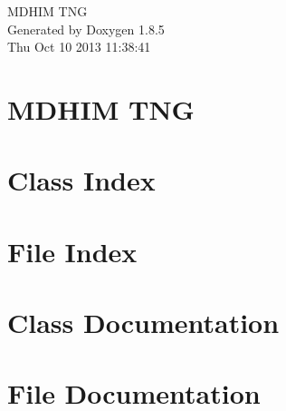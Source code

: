 \documentclass[twoside]{book}
\newcommand{\clearemptydoublepage}{%
  \newpage{\pagestyle{empty}\cleardoublepage}%
}
\begin{document}
\hypersetup{pageanchor=false}
\begin{titlepage}
\vspace*{7cm}
\begin{center}%
{\Large M\-D\-H\-I\-M T\-N\-G }\\
\vspace*{1cm}
{\large Generated by Doxygen 1.8.5}\\
\vspace*{0.5cm}
{\small Thu Oct 10 2013 11:38:41}\\
\end{center}
\end{titlepage}
\clearemptydoublepage
\tableofcontents
\clearemptydoublepage
{}
\hypersetup{pageanchor=true}

\chapter{M\-D\-H\-I\-M T\-N\-G}
\label{index}\hypertarget{index}{}
\chapter{Class Index}

\chapter{File Index}

\chapter{Class Documentation}

























\chapter{File Documentation}



















\newpage
{}
{}
\printindex
\end{document}
